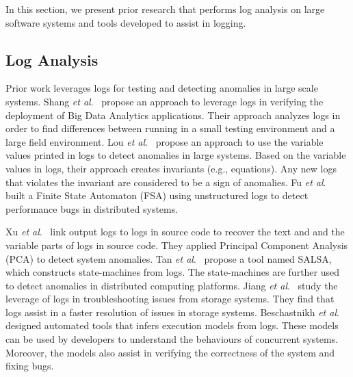 
In this section, we present prior research that performs log analysis on large software systems and tools developed to assist in logging. 


\subsection{Log Analysis}

Prior work leverages logs for testing and detecting anomalies in large scale systems. Shang\textsl{ et al$.$}~\cite{IanContextinformation} propose an approach to leverage logs in verifying the deployment of Big Data Analytics applications. Their approach analyzes logs in order to find differences between running in a small testing environment and a large field environment. Lou \textsl{et al}$.$~\cite{JGLouMining} propose an approach to use the variable values printed in logs to detect anomalies in large systems. Based on the variable values in logs, their approach creates invariants (e.g., equations). Any new logs that violates the invariant are considered to be a sign of anomalies. Fu \textsl{et al}$ . $~\cite{QFuanomaly} built a Finite State Automaton (FSA) using unstructured logs to detect performance bugs in distributed systems. 

\indent Xu \textsl{et al}$ . $~\cite{ConsoleLogs} link output logs to logs in source code to recover the text and and the variable parts of logs in source code. They applied Principal Component Analysis (PCA) to detect system anomalies. Tan \textsl{et al}$ . $~\cite{TanSalsa} propose a tool named SALSA, which constructs state-machines from logs. The state-machines are further used to detect anomalies in distributed computing platforms. Jiang \textsl{et al}$ . $~\cite{Jiang:2009:UCP:1525908.1525912} study the leverage of logs in troubleshooting issues from storage systems. They find that logs assist in a faster resolution of issues in storage systems. Beschastnikh \textsl{et al}$ . $~\cite{Beschastnikh:2011:LEI:2025113.2025151} designed automated tools that infers execution models from logs. These models can be used by developers to understand the behaviours of concurrent systems. Moreover, the models also assist in verifying the correctness of the system and fixing bugs.

